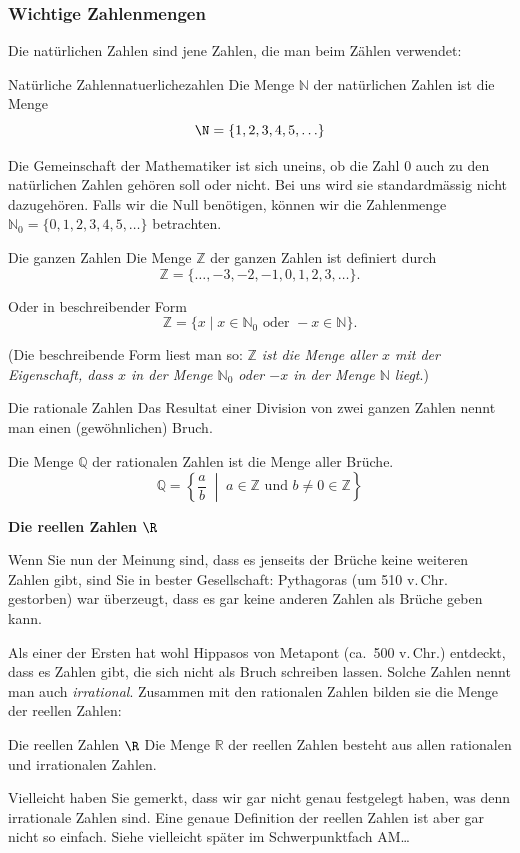 \subsubsection{Wichtige Zahlenmengen}
Die natürlichen Zahlen sind jene Zahlen, die man beim Zählen verwendet:
\begin{definition}{Natürliche Zahlen}{natuerlichezahlen}
    Die Menge \(\mathbb{N}\) der natürlichen Zahlen ist die Menge
    \[ \N = \{1, 2, 3, 4, 5, \ldots\} \]
\end{definition}
Die Gemeinschaft der Mathematiker ist sich uneins, ob die Zahl \(0\) auch zu den natürlichen Zahlen gehören soll oder nicht. Bei uns wird sie standardmässig nicht dazugehören. Falls wir die Null benötigen, können wir die Zahlenmenge \(\mathbb{N}_0 = \{0, 1, 2, 3, 4, 5, \ldots\}\) betrachten.

\begin{definition}{Die ganzen Zahlen}{}
    Die Menge \(\mathbb{Z}\) der ganzen Zahlen ist definiert durch
    \[
        \mathbb{Z} = \{\ldots, -3, -2, -1, 0, 1, 2, 3, \ldots\}.
    \]

    Oder in beschreibender Form
    \[
        \mathbb{Z} = \{x \mid x \in \mathbb{N}_0 \text{ oder } -x \in \mathbb{N}\}.
    \]

    (Die beschreibende Form liest man so: \textit{\(\mathbb{Z}\) ist die Menge aller \(x\) mit der Eigenschaft, dass \(x\) in der Menge \(\mathbb{N}_0\) oder \(-x\) in der Menge \(\mathbb{N}\) liegt}.)
\end{definition}

\begin{definition}
    {Die rationale Zahlen}{}
    Das Resultat einer Division von zwei ganzen Zahlen nennt man einen (gewöhnlichen) Bruch.

    Die Menge \(\mathbb{Q}\) der rationalen Zahlen ist die Menge aller Brüche.
    \[
        \mathbb{Q}
        =
        \left\{
        \frac{a}{b}
        \;\middle|\;
        a \in \mathbb{Z}
        \text{ und }
        b \neq 0 \in \mathbb{Z}
        \right\}
    \]
\end{definition}

\textbf{Die reellen Zahlen \(\R\) }

Wenn Sie nun der Meinung sind, dass es jenseits der Brüche keine weiteren Zahlen gibt, sind Sie in bester Gesellschaft: Pythagoras (um 510 v.\,Chr. gestorben) war überzeugt, dass es gar keine anderen Zahlen als Brüche geben kann.

Als einer der Ersten hat wohl Hippasos von Metapont (ca.\ 500 v.\,Chr.) entdeckt, dass es Zahlen gibt, die sich nicht als Bruch schreiben lassen. Solche Zahlen nennt man auch \textit{irrational}. Zusammen mit den rationalen Zahlen bilden sie die Menge der reellen Zahlen:
\begin{definition}
    {Die reellen Zahlen \(\R\)}{}
    Die Menge \(\mathbb{R}\) der reellen Zahlen besteht aus allen rationalen und irrationalen Zahlen.
\end{definition}
Vielleicht haben Sie gemerkt, dass wir gar nicht genau festgelegt haben, was denn irrationale Zahlen sind. Eine genaue Definition der reellen Zahlen ist aber gar nicht so einfach. Siehe vielleicht später im Schwerpunktfach AM\dots

